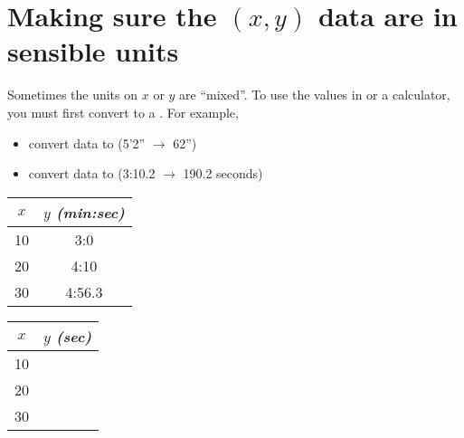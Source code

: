 \section{Making sure the $(x,y)$ data are in sensible units}

\begin{tcolorbox}[center,width=5.5in]
    \small
    Sometimes the units on $x$ or $y$ are ``mixed''. 
    To use the values in \myDesmos or a \myTi calculator, 
    you must first convert to a  . 
    For example,
    \begin{itemize}[nosep]
        \item convert  data to  (5'2'' $\rightarrow$ 62'')
            \item convert  data to  (3:10.2 $\rightarrow$ 190.2 seconds)
    \end{itemize}
\end{tcolorbox}

\vspace{-1\onelineskip}
{
    \small
    \begin{tabular}{c|c}
        \toprule 
        $x$ & $y$ {\footnotesize\itshape(min:sec)} \\ 
        \midrule 
        10 & 3:0 \\
        20 & 4:10 \\
        30 & 4:56.3 \\
        \bottomrule
    \end{tabular}
    \hfill
    \begin{tabular}{c|c}
        \toprule 
        $x$ & $y$ {\footnotesize\itshape(sec)} \\ 
        \midrule 
        10 & \hspace{0.5in} \\
        20 & \hspace{0.5in} \\
        30 & \hspace{0.5in} \\
        \bottomrule
    \end{tabular}
}